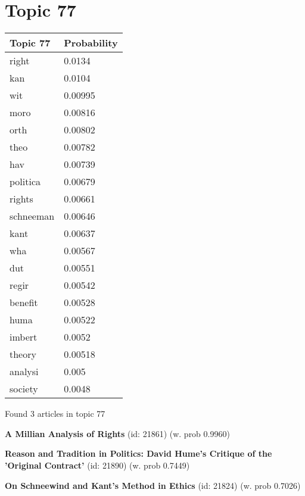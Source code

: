 \documentclass{article}
\begin{document}
\section*{Topic 77}\vfill
\begin{tabular}{ll}
\toprule
  Topic 77 & Probability \\
\midrule
     right &      0.0134 \\
       kan &      0.0104 \\
       wit &     0.00995 \\
      moro &     0.00816 \\
      orth &     0.00802 \\
      theo &     0.00782 \\
       hav &     0.00739 \\
  politica &     0.00679 \\
    rights &     0.00661 \\
 schneeman &     0.00646 \\
      kant &     0.00637 \\
       wha &     0.00567 \\
       dut &     0.00551 \\
     regir &     0.00542 \\
   benefit &     0.00528 \\
      huma &     0.00522 \\
    imbert &      0.0052 \\
    theory &     0.00518 \\
   analysi &       0.005 \\
   society &      0.0048 \\
\bottomrule
\end{tabular}

\vfill
Found 3 articles in topic 77
\vfill

\textbf{A Millian Analysis of Rights} (id: 21861)
 (w. prob 0.9960)
\vfill

\textbf{Reason and Tradition in Politics: David Hume's Critique of the 'Original Contract'} (id: 21890)
 (w. prob 0.7449)
\vfill

\textbf{On Schneewind and Kant's Method in Ethics} (id: 21824)
 (w. prob 0.7026)

\vfill
\newpage


\centering
\thispagestyle{empty}
\end{document}
